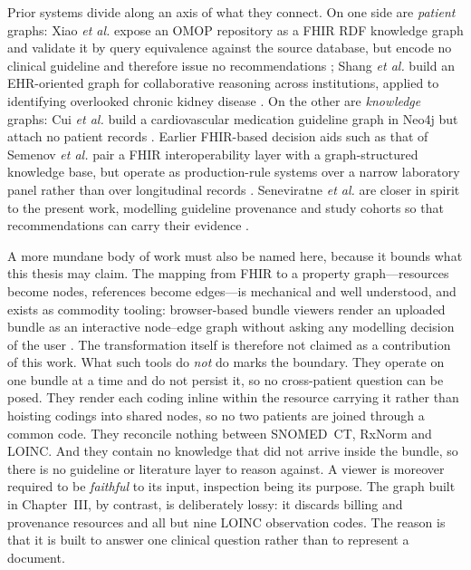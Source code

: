 Prior systems divide along an axis of what they connect. On one side are \emph{patient}
graphs: Xiao \textit{et al.} expose an OMOP repository as a FHIR RDF knowledge graph and
validate it by query equivalence against the source database, but
encode no clinical guideline and therefore issue no recommendations
\cite{xiao2022}; Shang \textit{et al.} build an EHR-oriented graph for collaborative
reasoning across institutions, applied to identifying overlooked chronic kidney disease
\cite{shang2024}. On the other are \emph{knowledge} graphs: Cui
\textit{et al.} build a cardiovascular medication guideline graph in Neo4j but
attach no patient records \cite{cui2025}. Earlier FHIR-based decision aids
such as that of Semenov \textit{et al.} pair a FHIR interoperability layer with a
graph-structured knowledge base, but operate as production-rule systems over
a narrow laboratory panel rather than over longitudinal records \cite{semenov2018}.
Seneviratne \textit{et al.} are closer in spirit to the present work, modelling guideline
provenance and study cohorts so that recommendations can carry their evidence
\cite{seneviratne2023}.

A more mundane body of work must also be named here, because it bounds what this thesis may
claim. The mapping from FHIR to a property graph---resources become nodes, references become
edges---is mechanical and well understood, and exists as commodity tooling: browser-based
bundle viewers render an uploaded bundle as an interactive node--edge graph without asking any
modelling decision of the user \cite{tenasol_viewer}. The transformation itself is therefore
not claimed as a contribution of this work. What such tools do \emph{not} do marks the
boundary. They operate on one bundle at a time and do not persist it, so no cross-patient
question can be posed. They render each coding inline within the resource carrying it rather
than hoisting codings into shared nodes, so no two patients are joined through a common code.
They reconcile nothing between SNOMED~CT, RxNorm and LOINC. And they contain no knowledge that
did not arrive inside the bundle, so there is no guideline or literature layer to reason
against. A viewer is moreover required to be \emph{faithful} to its input, inspection being its
purpose. The graph built in Chapter~III, by contrast, is deliberately lossy: it discards
billing and provenance resources and all but nine LOINC observation codes. The reason is
that it is built to answer one clinical question rather than to represent a document.

